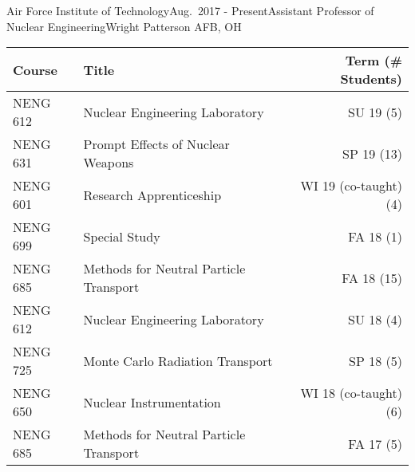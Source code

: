 \begin{rSubsection}{Air Force Institute of Technology}{Aug.\ 2017 - Present}{Assistant Professor of Nuclear Engineering}{Wright Patterson AFB, OH}

\begin{tabular}{ @{} l @{\hspace{6ex}} l @{\hspace{6ex}} r }
Course & Title & Term (\# Students) \\
\hline
NENG 612 & Nuclear Engineering Laboratory & SU 19 (5) \\
NENG 631 & Prompt Effects of Nuclear Weapons & SP 19 (13) \\
NENG 601 & Research Apprenticeship & WI 19 (co-taught) (4) \\
NENG 699 & Special Study & FA 18 (1) \\
NENG 685 & Methods for Neutral Particle Transport & FA 18 (15) \\
NENG 612 & Nuclear Engineering Laboratory & SU 18 (4) \\
NENG 725 & Monte Carlo Radiation Transport & SP 18 (5) \\
NENG 650 & Nuclear Instrumentation & WI 18 (co-taught) (6) \\
NENG 685 & Methods for Neutral Particle Transport & FA 17 (5) \\
\end{tabular}

\end{rSubsection}


